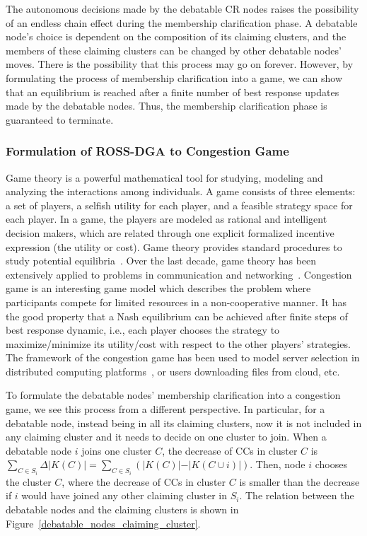\documentclass[times]{ettauth}
\newcommand{\ie}{i.e., }
\theoremstyle{mytheoremstyle}
\theoremstyle{mytheoremstyle}
\theoremstyle{mytheoremstyle}
\begin{document}
The autonomous decisions made by the debatable CR nodes raises the possibility of an endless chain effect during the membership clarification phase.
A debatable node's choice is dependent on the composition of its claiming clusters, and the members of these claiming clusters can be changed by other debatable nodes' moves.
There is the possibility that this process may go on forever.
However, by formulating the process of membership clarification into a game, we can show that an equilibrium is reached after a finite number of best response updates made by the debatable nodes.
Thus, the membership clarification phase is guaranteed to terminate.


\subsubsection{Formulation of ROSS-DGA to Congestion Game}
\label{clustering:phaseII:game}
Game theory is a powerful mathematical tool for studying, modeling and analyzing the interactions among individuals.
A game consists of three elements: a set of players, a selfish utility for each player, and a feasible strategy space for each player. 
In a game, the players are modeled as rational and intelligent decision makers, which are related through one explicit formalized incentive expression (the utility or cost).
Game theory provides standard procedures to study potential equilibria~\cite{game_for_communication_01}.
Over the last decade, game theory has been extensively applied to problems in communication and networking~\cite{Neel06analysisand, Wang_gtc_crn_survey_2010}.
Congestion game is an interesting game model which describes the problem where participants compete for limited resources in a non-cooperative manner.
It has the good property that a Nash equilibrium can be achieved after finite steps of best response dynamic, \ie each player chooses the strategy to maximize/minimize its utility/cost with respect to the other players' strategies.
The framework of the congestion game has been used to model server selection in distributed computing platforms~\cite{Cloud_Computing_2010}, or users downloading files from cloud, etc.

To formulate the debatable nodes' membership clarification into a congestion game, we see this process from a different perspective. 
In particular, for a debatable node, instead being in all its claiming clusters, now it is not included in any claiming cluster and it needs to decide on one cluster to join.
When a debatable node $i$ joins one cluster $C$, the decrease of CCs in cluster $C$ is $\sum_{C\in S_i}\Delta\vert K(C) \vert=\sum_{C\in S_i}({\vert K(C) \vert-\vert K(C\cup i) \vert})$.
Then, node $i$ chooses the cluster $C$, where the decrease of CCs in cluster $C$ is smaller than the decrease if $i$ would have joined any other claiming cluster in $S_i$.
The relation between the debatable nodes and the claiming clusters is shown in Figure~\ref{debatable_nodes_claiming_cluster}.
\end{document}
